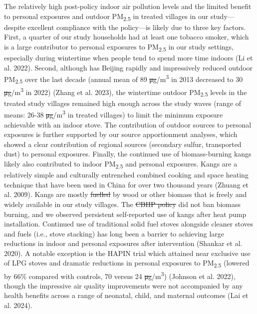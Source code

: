 \documentclass[
  letterpaper,
  DIV=11,
  numbers=noendperiod]{scrartcl}
\makeatletter
\providecommand{\DIFadd}[1]{{\protect\color{blue}\uwave{#1}}} %
\providecommand{\DIFdel}[1]{{\protect\color{red}\sout{#1}}} %
\providecommand{\DIFaddbegin}{} %
\providecommand{\DIFaddend}{} %
\providecommand{\DIFdelbegin}{} %
\providecommand{\DIFdelend}{} %
\newcommand{\DIFscaledelfig}{0.5}
\newlength{\DIFdelgraphicswidth} %
\newlength{\DIFdelgraphicsheight} %
\newcommand{\DIFaddincludegraphics}[2][]{{\color{blue}\fbox{\DIFOincludegraphics[#1]{#2}}}} %
\newcommand{\DIFdelincludegraphics}[2][]{%
\sbox{\DIFdelgraphicsbox}{\DIFOincludegraphics[#1]{#2}}%
\settoboxwidth{\DIFdelgraphicswidth}{\DIFdelgraphicsbox} %
\settoboxtotalheight{\DIFdelgraphicsheight}{\DIFdelgraphicsbox} %
\scalebox{\DIFscaledelfig}{%
\parbox[b]{\DIFdelgraphicswidth}{\usebox{\DIFdelgraphicsbox}\\[-\baselineskip] \rule{\DIFdelgraphicswidth}{0em}}\llap{\resizebox{\DIFdelgraphicswidth}{\DIFdelgraphicsheight}{%
\setlength{\unitlength}{\DIFdelgraphicswidth}%
\begin{picture}(1,1)%
\thicklines\linethickness{2pt} %
{\color[rgb]{1,0,0}\put(0,0){\framebox(1,1){}}}%
{\color[rgb]{1,0,0}\put(0,0){\line( 1,1){1}}}%
{\color[rgb]{1,0,0}\put(0,1){\line(1,-1){1}}}%
\end{picture}%
}\hspace*{3pt}}} %
} %
\DeclareRobustCommand{\DIFaddbegin}{\DIFOaddbegin \let\includegraphics\DIFaddincludegraphics} %
\DeclareRobustCommand{\DIFaddend}{\DIFOaddend \let\includegraphics\DIFOincludegraphics} %
\DeclareRobustCommand{\DIFdelbegin}{\DIFOdelbegin \let\includegraphics\DIFdelincludegraphics} %
\DeclareRobustCommand{\DIFdelend}{\DIFOaddend \let\includegraphics\DIFOincludegraphics} %
\let\sout@orig\sout %
\renewcommand{\sout}[1]{\ifmmode\text{\sout@orig{\ensuremath{#1}}}\else\sout@orig{#1}\fi} %
\makeatother
\begin{document}
The relatively high post-policy indoor air pollution levels and the
limited benefit to personal exposures and outdoor PM\textsubscript{2.5}
in treated villages in our study---despite excellent compliance with the
policy---is likely due to three key factors. First, a quarter of our
study households had at least one tobacco smoker, which is a large
contributor to personal exposures to PM\textsubscript{2.5} in our study
settings, especially during wintertime when people tend to spend more
time indoors (Li et al. 2022). Second, although has Beijing rapidly and
impressively reduced outdoor PM\textsubscript{2.5} over the last decade
(annual mean of 89 \DIFdelbegin \DIFdel{μg}\DIFdelend \DIFaddbegin \DIFadd{µg}\DIFaddend /m\textsuperscript{3} in 2013 decreased to 30
\DIFdelbegin \DIFdel{μg}\DIFdelend \DIFaddbegin \DIFadd{µg}\DIFaddend /m\textsuperscript{3} in 2022) (Zhang et al. 2023), the wintertime
outdoor PM\textsubscript{2.5} levels in the treated study villages
remained high enough across the study waves (range of means: 26-38
\DIFdelbegin \DIFdel{μg}\DIFdelend \DIFaddbegin \DIFadd{µg}\DIFaddend /m\textsuperscript{3} in treated villages) to limit the minimum
exposure achievable with an indoor stove. The contribution of outdoor
sources to personal exposures is further supported by our source
apportionment analyses, which showed a clear contribution of regional
sources (secondary sulfur, transported dust) to personal exposures.
Finally, the continued use of biomass-burning kangs likely also
contributed to indoor PM\textsubscript{2.5} and personal exposures.
Kangs are a relatively simple and culturally entrenched combined cooking
and space heating technique that have been used in China for over two
thousand years (Zhuang et al. 2009). Kangs are mostly \DIFdelbegin \DIFdel{fuelled }\DIFdelend \DIFaddbegin \DIFadd{fueled }\DIFaddend by wood or
other biomass that is freely and widely available in our study villages.
The \DIFdelbegin \DIFdel{CBHP policy }\DIFdelend \DIFaddbegin \DIFadd{CHP }\DIFaddend did not ban biomass burning, and we observed persistent
self-reported use of kangs after heat pump installation. Continued use
of traditional solid fuel stoves alongside cleaner stoves and fuels
(i.e., stove stacking) has long been a barrier to achieving large
reductions in indoor and personal exposures after intervention (Shankar
et al. 2020). A notable exception is the HAPIN trial which attained near
exclusive use of LPG stoves and dramatic reductions in personal
exposures to PM\textsubscript{2.5} (lowered by 66\% compared with
controls, 70 versus 24 \DIFdelbegin \DIFdel{μg}\DIFdelend \DIFaddbegin \DIFadd{µg}\DIFaddend /m\textsuperscript{3}) (Johnson et al. 2022),
though the impressive air quality improvements were not accompanied by
any health benefits across a range of neonatal, child, and maternal
outcomes (Lai et al. 2024).
\end{document}
